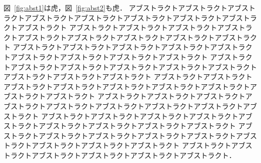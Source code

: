 \documentclass[a4paper,fleqn,dvipdfmx,12pt]{jsarticle}
\begin{document}
図~\ref{fig:abst1}は虎，図~\ref{fig:abst2}も虎．
アブストラクトアブストラクトアブストラクトアブストラクトアブストラクトアブストラクトアブストラクトアブストラクトアブストラクト
アブストラクトアブストラクトアブストラクトアブストラクトアブストラクトアブストラクトアブストラクトアブストラクトアブストラクト
アブストラクトアブストラクトアブストラクトアブストラクトアブストラクトアブストラクトアブストラクトアブストラクトアブストラクト
アブストラクトアブストラクトアブストラクトアブストラクトアブストラクトアブストラクトアブストラクトアブストラクトアブストラクト
アブストラクトアブストラクトアブストラクトアブストラクトアブストラクトアブストラクトアブストラクトアブストラクトアブストラクト
アブストラクトアブストラクトアブストラクトアブストラクトアブストラクトアブストラクトアブストラクトアブストラクトアブストラクト
アブストラクトアブストラクトアブストラクトアブストラクトアブストラクトアブストラクトアブストラクトアブストラクトアブストラクト
アブストラクトアブストラクトアブストラクトアブストラクトアブストラクトアブストラクトアブストラクトアブストラクトアブストラクト
アブストラクトアブストラクトアブストラクトアブストラクトアブストラクトアブストラクト．
\end{document}
